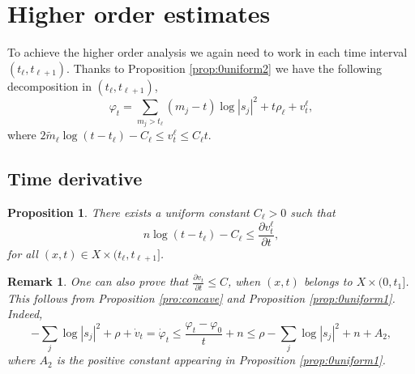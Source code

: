 \documentclass[10pt,a4paper]{amsart}
\numberwithin{equation}{section}
\newtheorem{prop}[theorem]{Proposition}
\newtheorem{remark}[theorem]{Remark}
\newcommand{\f}{\varphi}
\begin{document}
  


 






\section{Higher order estimates}  \label{sec:logsmooth}

To achieve the higher order analysis we again need to  work in each time interval $(t_{\ell},t_{\ell+1})$. 
 Thanks to Proposition \ref{prop:0uniform2} we have the following decomposition in $(t_\ell, t_{\ell+1})$,
 $$
\f_t=\sum_{m_j>t_{\ell}} (m_j-t) \log |s_j|^2+t \rho_{\ell}+v_t^\ell,
$$
where $ 2 \tilde{m}_\ell \log (t-t_\ell) -C_\ell  \leq v_{t}^{\ell} \leq C_\ell t$.


   
   
 
 \subsection{Time derivative}
 
\begin{prop} \label{pro:STbelow}
There exists a uniform constant $C_\ell>0$ such that 
 $$
 n \log (t-t_{\ell}) -C_\ell \leq \frac{\partial v_t^\ell}{\partial t}, 
$$
for all $(x,t) \in X \times (t_\ell, t_{\ell +1}]$.
\end{prop}

\begin{remark}
 One can also prove that $\frac{\partial v_t}{\partial t} \leq C$, when $(x,t)$ belongs to $X \times (0,t_1]$. 
 This  follows from Proposition \ref{pro:concave} and Proposition \ref{prop:0uniform1}. Indeed,
	\[
	-\sum_j \log|s_j|^2+\rho+\dot{v}_t=\dot{\varphi}_t \leq \frac{\varphi_t-\varphi_0}{t} +n \leq \rho-\sum_j \log|s_j|^2 +n+A_2,
	\]
	where $A_2$ is the positive constant appearing in Proposition \ref{prop:0uniform1}. 
\end{remark}
\end{document}
